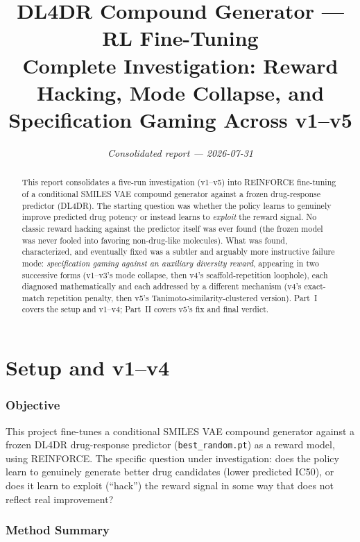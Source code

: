 \documentclass[11pt]{article}
\title{\textbf{DL4DR Compound Generator --- RL Fine-Tuning}\\[4pt]
\Large Complete Investigation: Reward Hacking, Mode Collapse, and\\Specification Gaming Across v1--v5}
\author{}
\date{\itshape\color{notegray} Consolidated report --- 2026-07-31}
\newcommand{\code}[1]{\texttt{#1}}
\begin{document}
\maketitle
\vspace{-1.5em}

\begin{abstract}
\noindent
This report consolidates a five-run investigation (v1--v5) into REINFORCE fine-tuning of a conditional SMILES VAE compound generator against a frozen drug-response predictor (DL4DR). The starting question was whether the policy learns to genuinely improve predicted drug potency or instead learns to \emph{exploit} the reward signal. No classic reward hacking against the predictor itself was ever found (the frozen model was never fooled into favoring non-drug-like molecules). What was found, characterized, and eventually fixed was a subtler and arguably more instructive failure mode: \emph{specification gaming against an auxiliary diversity reward}, appearing in two successive forms (v1--v3's mode collapse, then v4's scaffold-repetition loophole), each diagnosed mathematically and each addressed by a different mechanism (v4's exact-match repetition penalty, then v5's Tanimoto-similarity-clustered version). Part~I covers the setup and v1--v4; Part~II covers v5's fix and final verdict.
\end{abstract}

\tableofcontents
\newpage

\part{Setup and v1--v4}

\section{Objective}

This project fine-tunes a conditional SMILES VAE compound generator against a frozen DL4DR drug-response predictor (\code{best\_random.pt}) as a reward model, using REINFORCE. The specific question under investigation: does the policy learn to genuinely generate better drug candidates (lower predicted IC50), or does it learn to exploit (``hack'') the reward signal in some way that does not reflect real improvement?

\section{Method Summary}
\end{document}
